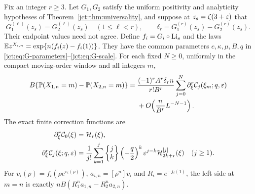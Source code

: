 \begin{theorem}
\label{jct:thm:matched-jets}
Fix an integer $r\ge3$. Let $G_1,G_2$ satisfy the uniform positivity
and analyticity hypotheses of Theorem~\ref{jct:thm:universality}, and suppose
at $z_s=\zeta(3+\varepsilon)$ that
\[
 G_1^{(\ell)}(z_s)=G_2^{(\ell)}(z_s)\quad(1\le\ell<r),
 \qquad \delta_r=G_1^{(r)}(z_s)-G_2^{(r)}(z_s).
\]
Their endpoint values need not agree. Define $f_i=G_i\circ\operatorname{Li}_s$ and
the laws $\mathbb E z^{X_{i,n}}=\exp\{n(f_i(z)-f_i(1))\}$.
They have the common parameters $c,\kappa,\mu,B,q$ in
\eqref{jct:eq:G-parameters}--\eqref{jct:eq:G-scale}.
For each fixed $N\ge0$, uniformly in the compact moving-order window
and all integers $m$,
\begin{equation}\label{jct:eq:matched-jets}
\begin{split}
 B\{\mathbb{P}(X_{1,n}=m)-\mathbb{P}(X_{2,n}=m)\}
 ={}&\frac{(-1)^r A^r\delta_r n}{r!B^r}
       \sum_{j=0}^N\partial_\xi^r\mathcal C_j(\xi_m;q,\varepsilon)\\
 &+O\!\left(\frac n{B^r}L^{-N-1}\right).
\end{split}
\end{equation}
The exact finite correction functions are
\begin{align}
 \partial_\xi^r\mathcal C_0(\xi)&=\mathcal{H}_r(\xi),\notag\\
 \partial_\xi^r\mathcal C_j(\xi;q,\varepsilon)
 &=\frac1{j!}\sum_{k=1}^j\left\{\begin{matrix}j\\k\end{matrix}\right\}
       \left(-\frac q2\right)^k\varepsilon^{j-k}
       \mathcal{H}_{2k+r}^{[j]}(\xi)\quad(j\ge1).
       \label{jct:eq:shifted-kernels}
\end{align}
For $v_i(\rho)=f_i(\rho e^{v_i(\rho)})$, $a_{i,n}=[\rho^n]v_i$
and $R_i=e^{-f_i(1)}$, the left side at $m=n$ is exactly
$nB(R_1^n a_{1,n}-R_2^n a_{2,n})$.
\end{theorem}

